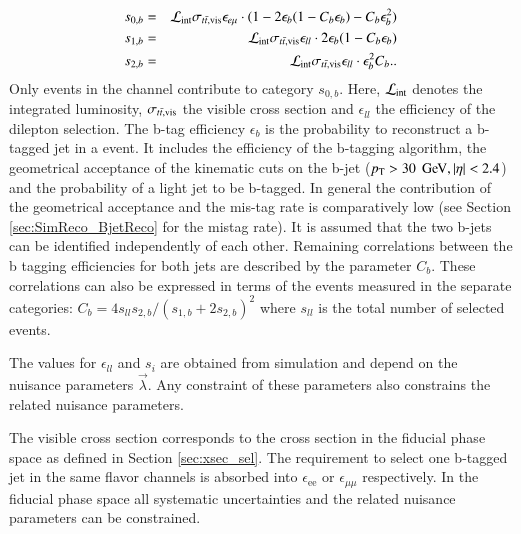 \begin{eqnarray}
s_{0,b}  &=& \mathcal{L}_{\rm int}\sigma_{t\bar{t},\mathrm{vis}} \epsilon_{e\mu} \cdot (1-2\epsilon_b(1-C_b\epsilon_b)-C_b\epsilon_b^2) \\
s_{1,b}  &=& \mathcal{L}_{\rm int} \sigma_{t\bar{t},\mathrm{vis}} \epsilon_{ll} \cdot 2 \epsilon_b(1-C_b\epsilon_b) \\
s_{2,b}  &=& \mathcal{L}_{\rm int} \sigma_{t\bar{t},\mathrm{vis}} \epsilon_{ll} \cdot   \epsilon_b^2 C_b.
\label{eq:xsec_nb}.
\end{eqnarray}
Only events in the \emu channel contribute to category $s_{0,b}$.
Here, $\mathcal{L}_{\rm int}$ denotes the integrated luminosity, $\sigma_{t\bar{t},\mathrm{vis}}$ the visible \ttbar cross section and $\epsilon_{ll}$ the efficiency of the dilepton selection.
The b-tag efficiency $\epsilon_b$ is the probability to reconstruct a b-tagged jet in a \ttbar event. It includes the efficiency of the b-tagging algorithm, the geometrical acceptance of the kinematic cuts on the b-jet ($p_{\mathrm{T}} > 30\; \,\text{Ge\hspace{-.08em}V}, |\eta|<2.4$) and the probability of a light jet to be b-tagged. In general the contribution of the geometrical acceptance and the mis-tag rate is comparatively low (see Section \ref{sec:SimReco_BjetReco} for the mistag rate).
It is assumed that the two b-jets can be identified independently of each other. Remaining correlations between the b tagging efficiencies for both jets are described by the parameter $C_b$. These correlations can also be expressed in terms of the events measured in the separate categories: $C_b=4s_{ll}s_{2,b}/(s_{1,b}+2s_{2,b})^2$ where $s_{ll}$ is the total number of selected \ttbar events. 

The values for $\epsilon_{ll}$ and $s_{i}$ are obtained from simulation and depend on the nuisance parameters $\vec{\lambda}$. Any constraint of these parameters also constrains the related nuisance parameters.

The visible cross section corresponds to the cross section in the fiducial phase space as defined in Section \ref{sec:xsec_sel}. The requirement to select one b-tagged jet in the same flavor channels is absorbed into $\epsilon_{\mathrm{ee}}$ or $\epsilon_{\mu\mu}$ respectively.
In the fiducial phase space all systematic uncertainties and the related nuisance parameters can be constrained.

